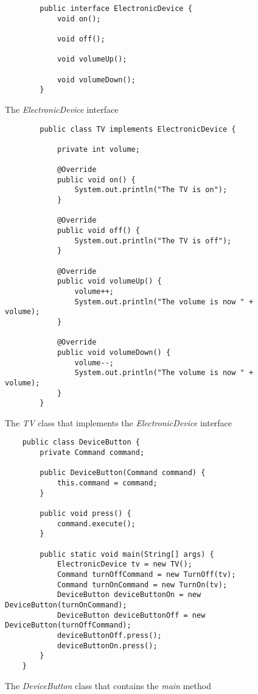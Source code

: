 \begin{figure}[H]
	\begin{lstlisting}
		public interface ElectronicDevice {
			void on();
			
			void off();
			
			void volumeUp();
			
			void volumeDown();
		}
	\end{lstlisting}
	\caption{The \textit{ElectronicDevice} interface}
	\label{fig12}
\end{figure}
\begin{figure}[H]
	\begin{lstlisting}
		public class TV implements ElectronicDevice {
			
			private int volume;
			
			@Override
			public void on() {
				System.out.println("The TV is on");
			}
			
			@Override
			public void off() {
				System.out.println("The TV is off");
			}
			
			@Override
			public void volumeUp() {
				volume++;
				System.out.println("The volume is now " + volume);
			}
			
			@Override
			public void volumeDown() {
				volume--;
				System.out.println("The volume is now " + volume);
			}
		}
	\end{lstlisting}
	\caption{The \textit{TV} class that implements the \textit{ElectronicDevice} interface}
	\label{fig13}
\end{figure}
\begin{figure}[H]
	\begin{lstlisting}
	public class DeviceButton {
		private Command command;
		
		public DeviceButton(Command command) {
			this.command = command;
		}
		
		public void press() {
			command.execute();
		}
		
		public static void main(String[] args) {
			ElectronicDevice tv = new TV();
			Command turnOffCommand = new TurnOff(tv);
			Command turnOnCommand = new TurnOn(tv);
			DeviceButton deviceButtonOn = new DeviceButton(turnOnCommand);
			DeviceButton deviceButtonOff = new DeviceButton(turnOffCommand);
			deviceButtonOff.press();
			deviceButtonOn.press();
		}
	}
	\end{lstlisting}
	\caption{The \textit{DeviceButton} class that contains the \textit{main} method}
	\label{fig14}
\end{figure}
